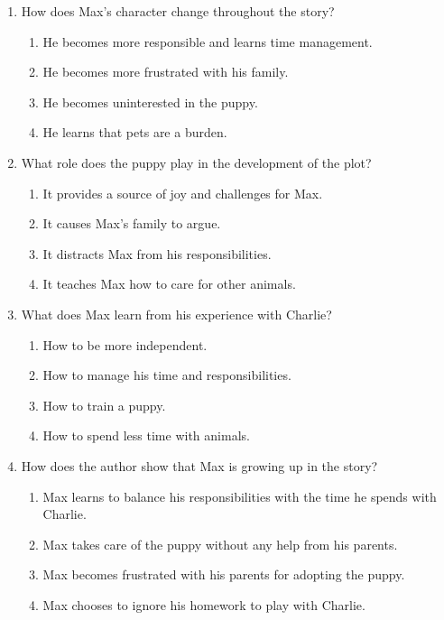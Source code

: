 \documentclass[12pt]{article}
\begin{document}
\begin{enumerate}
    \item How does Max's character change throughout the story?
    \begin{enumerate}[label=\Alph*.]
        \item He becomes more responsible and learns time management.
        \item He becomes more frustrated with his family.
        \item He becomes uninterested in the puppy.
        \item He learns that pets are a burden.
    \end{enumerate}
    \vspace{0.5cm}

    \item What role does the puppy play in the development of the plot?
    \begin{enumerate}[label=\Alph*.]
        \item It provides a source of joy and challenges for Max.
        \item It causes Max’s family to argue.
        \item It distracts Max from his responsibilities.
        \item It teaches Max how to care for other animals.
    \end{enumerate}
    \vspace{0.5cm}

    \item What does Max learn from his experience with Charlie?
    \begin{enumerate}[label=\Alph*.]
        \item How to be more independent.
        \item How to manage his time and responsibilities.
        \item How to train a puppy.
        \item How to spend less time with animals.
    \end{enumerate}
    \vspace{0.5cm}

    \item How does the author show that Max is growing up in the story?
    \begin{enumerate}[label=\Alph*.]
        \item Max learns to balance his responsibilities with the time he spends with Charlie.
        \item Max takes care of the puppy without any help from his parents.
        \item Max becomes frustrated with his parents for adopting the puppy.
        \item Max chooses to ignore his homework to play with Charlie.
    \end{enumerate}
    \vspace{0.5cm}


\end{enumerate}
\end{document}
